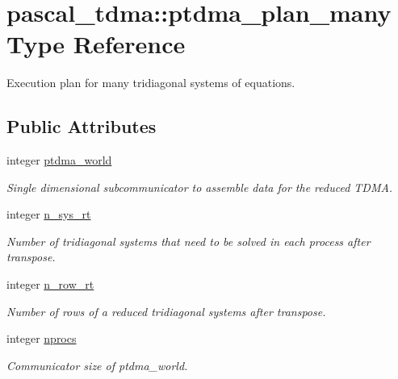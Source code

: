 \hypertarget{structpascal__tdma_1_1ptdma__plan__many}{}\section{pascal\+\_\+tdma\+:\+:ptdma\+\_\+plan\+\_\+many Type Reference}
\label{structpascal__tdma_1_1ptdma__plan__many}


Execution plan for many tridiagonal systems of equations.  


\subsection*{Public Attributes}
\begin{DoxyCompactItemize}
\item 
integer \hyperlink{structpascal__tdma_1_1ptdma__plan__many_acb7e645e37c791564905c6e2808db0c6}{ptdma\+\_\+world}
\begin{DoxyCompactList}\small\item\em Single dimensional subcommunicator to assemble data for the reduced T\+D\+MA. \end{DoxyCompactList}\item 
integer \hyperlink{structpascal__tdma_1_1ptdma__plan__many_a22b42947ab742f83aad3bbeb3a42a0f6}{n\+\_\+sys\+\_\+rt}
\begin{DoxyCompactList}\small\item\em Number of tridiagonal systems that need to be solved in each process after transpose. \end{DoxyCompactList}\item 
integer \hyperlink{structpascal__tdma_1_1ptdma__plan__many_ad94248e2aa0653f151f0575d62d6fff7}{n\+\_\+row\+\_\+rt}
\begin{DoxyCompactList}\small\item\em Number of rows of a reduced tridiagonal systems after transpose. \end{DoxyCompactList}\item 
integer \hyperlink{structpascal__tdma_1_1ptdma__plan__many_aefad054b588906989c2fdfc5ef9cb6d4}{nprocs}
\begin{DoxyCompactList}\small\item\em Communicator size of ptdma\+\_\+world. \end{DoxyCompactList}\end{DoxyCompactItemize}
\textbf{ }\par
